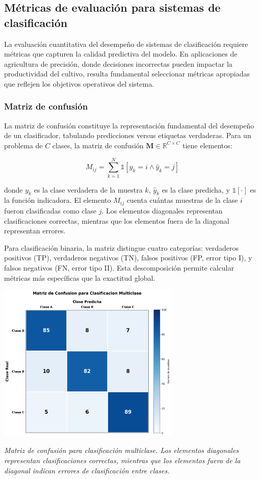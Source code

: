 \subsection{Métricas de evaluación para sistemas de clasificación}

La evaluación cuantitativa del desempeño de sistemas de clasificación requiere métricas que capturen la calidad predictiva del modelo. En aplicaciones de agricultura de precisión, donde decisiones incorrectas pueden impactar la productividad del cultivo, resulta fundamental seleccionar métricas apropiadas que reflejen los objetivos operativos del sistema.

\subsubsection{Matriz de confusión}

La matriz de confusión constituye la representación fundamental del desempeño de un clasificador, tabulando predicciones versus etiquetas verdaderas. Para un problema de $C$ clases, la matriz de confusión $\mathbf{M} \in \mathbb{R}^{C \times C}$ tiene elementos:

\begin{equation}
M_{ij} = \sum_{k=1}^{N} \mathbb{1}[y_k = i \land \hat{y}_k = j]
\end{equation}

donde $y_k$ es la clase verdadera de la muestra $k$, $\hat{y}_k$ es la clase predicha, y $\mathbb{1}[\cdot]$ es la función indicadora. El elemento $M_{ij}$ cuenta cuántas muestras de la clase $i$ fueron clasificadas como clase $j$. Los elementos diagonales representan clasificaciones correctas, mientras que los elementos fuera de la diagonal representan errores.

Para clasificación binaria, la matriz distingue cuatro categorías: verdaderos positivos (TP), verdaderos negativos (TN), falsos positivos (FP, error tipo I), y falsos negativos (FN, error tipo II). Esta descomposición permite calcular métricas más específicas que la exactitud global.

\begin{table}[h]
\centering
\includegraphics[width=0.65\textwidth]{imagenes/matriz_confusion_ejemplo.png}
\caption{\textit{Matriz de confusión para clasificación multiclase. Los elementos diagonales representan clasificaciones correctas, mientras que los elementos fuera de la diagonal indican errores de clasificación entre clases.}}
\label{fig:matriz_confusion}
\end{table}

